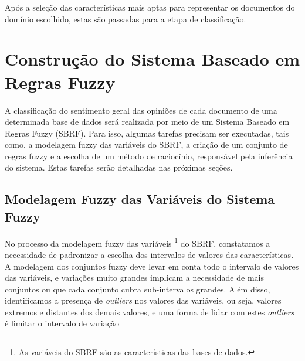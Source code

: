\documentclass[template.tex]{subfiles}
\begin{document}
Após a seleção das características mais aptas para representar os documentos do domínio escolhido, estas são passadas para a etapa de classificação. 

\section{Construção do Sistema Baseado em Regras Fuzzy}


A classificação do sentimento geral das opiniões de cada documento de uma determinada base de dados será realizada por meio de um Sistema Baseado em Regras Fuzzy (SBRF). Para isso, algumas tarefas precisam ser executadas, tais como, a modelagem fuzzy das variáveis do SBRF, a criação de um conjunto de regras fuzzy e a escolha de um método de raciocínio, responsável pela inferência do sistema. Estas tarefas serão detalhadas nas próximas seções.

\subsection{Modelagem Fuzzy das Variáveis do Sistema Fuzzy}

No processo da modelagem fuzzy das variáveis \footnote{As variáveis do SBRF são as características das bases de dados.} do SBRF, constatamos a necessidade de padronizar a escolha dos intervalos de valores das características. A modelagem dos conjuntos fuzzy deve levar em conta todo o intervalo de valores das variáveis, e variações muito grandes implicam a necessidade de mais conjuntos ou que cada conjunto cubra sub-intervalos grandes. Além disso, identificamos a presença de \textit{outliers} nos valores das variáveis, ou seja, valores extremos e distantes dos demais valores, e uma forma de lidar com estes \textit{outliers} é limitar o intervalo de variação
\end{document}
